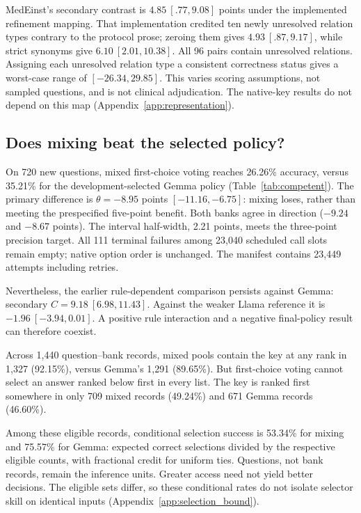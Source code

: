 \documentclass{article}
\begin{document}
MedEinst's secondary contrast is $4.85\ [.77,9.08]$ points under the implemented refinement mapping. That implementation credited ten newly unresolved relation types contrary to the protocol prose; zeroing them gives $4.93\ [.87,9.17]$, while strict synonyms give $6.10\ [2.01,10.38]$. All 96 pairs contain unresolved relations. Assigning each unresolved relation type a consistent correctness status gives a worst-case range of $[-26.34,29.85]$. This varies scoring assumptions, not sampled questions, and is not clinical adjudication. The native-key results do not depend on this map (Appendix~\ref{app:representation}).

\subsection{Does mixing beat the selected policy?}
On 720 new questions, mixed first-choice voting reaches 26.26\% accuracy, versus 35.21\% for the development-selected Gemma policy (Table~\ref{tab:competent}). The primary difference is $\theta=-8.95$ points $[-11.16,-6.75]$: mixing loses, rather than meeting the prespecified five-point benefit. Both banks agree in direction ($-9.24$ and $-8.67$ points). The interval half-width, 2.21 points, meets the three-point precision target. All 111 terminal failures among 23,040 scheduled call slots remain empty; native option order is unchanged. The manifest contains 23,449 attempts including retries.

Nevertheless, the earlier rule-dependent comparison persists against Gemma: secondary $C=9.18\ [6.98,11.43]$. Against the weaker Llama reference it is $-1.96\ [-3.94,0.01]$. A positive rule interaction and a negative final-policy result can therefore coexist.

Across 1,440 question--bank records, mixed pools contain the key at any rank in 1,327 (92.15\%), versus Gemma's 1,291 (89.65\%). But first-choice voting cannot select an answer ranked below first in every list. The key is ranked first somewhere in only 709 mixed records (49.24\%) and 671 Gemma records (46.60\%).

Among these eligible records, conditional selection success is 53.34\% for mixing and 75.57\% for Gemma: expected correct selections divided by the respective eligible counts, with fractional credit for uniform ties. Questions, not bank records, remain the inference units. Greater access need not yield better decisions. The eligible sets differ, so these conditional rates do not isolate selector skill on identical inputs (Appendix~\ref{app:selection_bound}).
\end{document}
